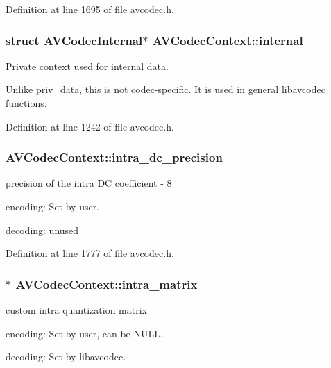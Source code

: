 Definition at line 1695 of file avcodec.\+h.

\subsubsection[{\texorpdfstring{internal}{internal}}]{\setlength{\rightskip}{0pt plus 5cm}struct A\+V\+Codec\+Internal$\ast$ A\+V\+Codec\+Context\+::internal}\hypertarget{struct_a_v_codec_context_aeffc0091dc3138015b53107c8ffb04af}{}\label{struct_a_v_codec_context_aeffc0091dc3138015b53107c8ffb04af}
Private context used for internal data.

Unlike priv\+\_\+data, this is not codec-\/specific. It is used in general libavcodec functions. 

Definition at line 1242 of file avcodec.\+h.

\subsubsection[{\texorpdfstring{intra\+\_\+dc\+\_\+precision}{intra_dc_precision}}]{ A\+V\+Codec\+Context\+::intra\+\_\+dc\+\_\+precision}\hypertarget{struct_a_v_codec_context_ac5c1b3cd296d19d7492e554d987d00e7}{}\label{struct_a_v_codec_context_ac5c1b3cd296d19d7492e554d987d00e7}
precision of the intra DC coefficient -\/ 8
\begin{DoxyItemize}
\item encoding\+: Set by user.
\item decoding\+: unused 
\end{DoxyItemize}

Definition at line 1777 of file avcodec.\+h.

\subsubsection[{\texorpdfstring{intra\+\_\+matrix}{intra_matrix}}]{$\ast$ A\+V\+Codec\+Context\+::intra\+\_\+matrix}\hypertarget{struct_a_v_codec_context_ab2c2db3596802edecafa24e494b33879}{}\label{struct_a_v_codec_context_ab2c2db3596802edecafa24e494b33879}
custom intra quantization matrix
\begin{DoxyItemize}
\item encoding\+: Set by user, can be N\+U\+LL.
\item decoding\+: Set by libavcodec. 
\end{DoxyItemize}

